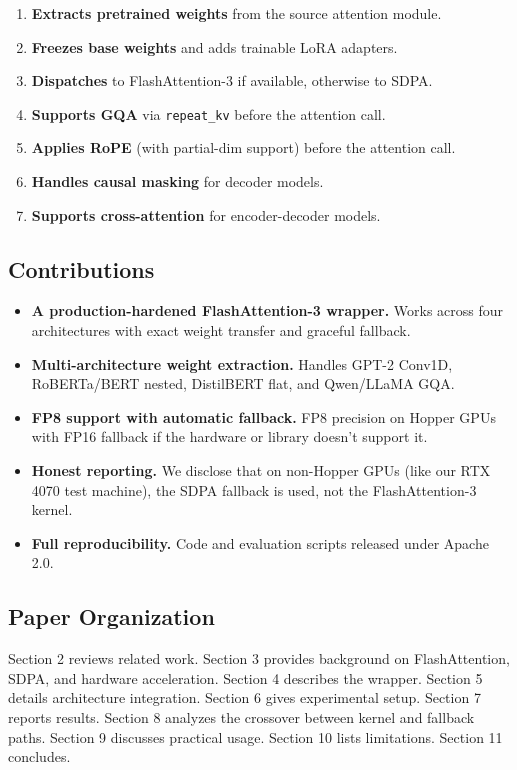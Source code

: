 \begin{enumerate}
\item \textbf{Extracts pretrained weights} from the source attention module.
\item \textbf{Freezes base weights} and adds trainable LoRA adapters.
\item \textbf{Dispatches} to FlashAttention-3 if available, otherwise to SDPA.
\item \textbf{Supports GQA} via \texttt{repeat\_kv} before the attention call.
\item \textbf{Applies RoPE} (with partial-dim support) before the attention call.
\item \textbf{Handles causal masking} for decoder models.
\item \textbf{Supports cross-attention} for encoder-decoder models.

\end{enumerate}
\subsection{Contributions}

\begin{itemize}
\item \textbf{A production-hardened FlashAttention-3 wrapper.} Works across four
  architectures with exact weight transfer and graceful fallback.
\item \textbf{Multi-architecture weight extraction.} Handles GPT-2 Conv1D,
  RoBERTa/BERT nested, DistilBERT flat, and Qwen/LLaMA GQA.
\item \textbf{FP8 support with automatic fallback.} FP8 precision on Hopper GPUs
  with FP16 fallback if the hardware or library doesn't support it.
\item \textbf{Honest reporting.} We disclose that on non-Hopper GPUs (like our
  RTX 4070 test machine), the SDPA fallback is used, not the FlashAttention-3
  kernel.
\item \textbf{Full reproducibility.} Code and evaluation scripts released under
  Apache 2.0.

\end{itemize}
\subsection{Paper Organization}

Section 2 reviews related work. Section 3 provides background on 
FlashAttention, SDPA, and hardware acceleration. Section 4 describes the 
wrapper. Section 5 details architecture integration. Section 6 gives 
experimental setup. Section 7 reports results. Section 8 analyzes the 
crossover between kernel and fallback paths. Section 9 discusses practical 
usage. Section 10 lists limitations. Section 11 concludes.



